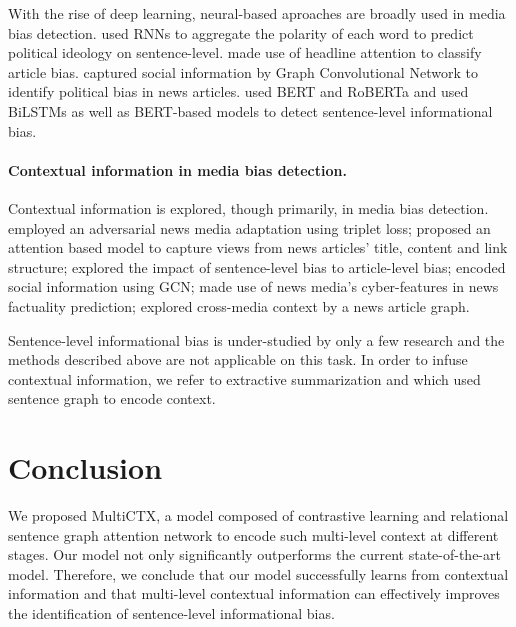 \documentclass[letterpaper]{article} %
\begin{document}
With the rise of deep learning, neural-based aproaches are broadly used in media bias detection. \citet{iyyer-etal-2014-political} used RNNs to aggregate
the polarity of each word to predict political ideology on sentence-level. \citet{gangula-etal-2019-detecting}
made use of headline attention to classify article
bias. \citet{li-goldwasser-2019-encoding} captured social information by Graph Convolutional Network to identify political bias in news articles. \citet{fan-etal-2019-plain} used BERT and RoBERTa and \citet{van-den-berg-markert-2020-context} used BiLSTMs as well as BERT-based models to detect sentence-level informational bias.
\paragraph{Contextual information in media bias detection.} 
Contextual information is explored, though primarily, in media bias detection. \citet{baly2020detect} employed an adversarial news media adaptation using triplet loss; \citet{kulkarni-etal-2018-multi} proposed an attention based model to capture views from news articles' title, content and link structure; \citet{chen-etal-2020-detecting} explored the impact of sentence-level bias to article-level bias; \citet{li-goldwasser-2019-encoding} encoded social information using GCN; \citet{baly-etal-2018-predicting} made use of news media's cyber-features in news factuality prediction; \citet{10.1145/3366423.3380158} explored cross-media context by a news article graph.

Sentence-level informational bias is under-studied by only a few research and the methods described above are not applicable on this task. In order to infuse contextual information, we refer to extractive summarization \citet{10.1145/3397271.3401327} and \citet{christensen-etal-2013-towards} which used sentence graph to encode context.

\section{Conclusion}

We proposed MultiCTX, a model composed of contrastive learning 
and relational sentence graph attention network to encode such multi-level context at different stages.
Our model not only significantly outperforms the current 
state-of-the-art model. Therefore, we conclude that our model 
successfully learns from contextual information and 
that multi-level contextual information can effectively improves 
the identification of sentence-level informational bias. 



\end{document}
